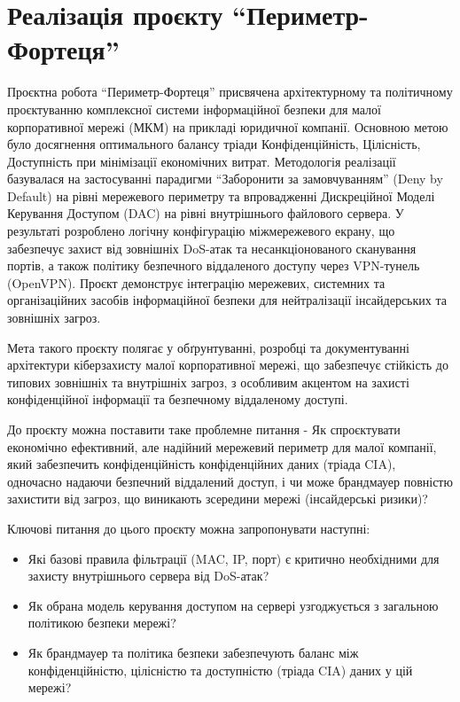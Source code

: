 


\section {\centering Реалізація проєкту ``Периметр-Фортеця''}

Проєктна робота ``Периметр-Фортеця''  присвячена архітектурному та політичному проєктуванню комплексної системи інформаційної безпеки для малої корпоративної мережі (МКМ) на прикладі юридичної компанії. Основною метою було досягнення оптимального балансу тріади Конфіденційність, Цілісність, Доступність при мінімізації економічних витрат. Методологія реалізації базувалася на застосуванні парадигми ``Заборонити за замовчуванням'' (Deny by Default) на рівні мережевого периметру та впровадженні Дискреційної Моделі Керування Доступом (DAC) на рівні внутрішнього файлового сервера. У результаті розроблено логічну конфігурацію міжмережевого екрану, що забезпечує захист від зовнішніх DoS-атак та несанкціонованого сканування портів, а також політику безпечного віддаленого доступу через VPN-тунель (OpenVPN). Проєкт демонструє інтеграцію мережевих, системних та організаційних засобів інформаційної безпеки для нейтралізації інсайдерських та зовнішніх загроз.

Мета такого проєкту полягає у обґрунтуванні, розробці та документуванні архітектури кіберзахисту малої корпоративної мережі, що забезпечує стійкість до типових зовнішніх та внутрішніх загроз, з особливим акцентом на захисті конфіденційної інформації та безпечному віддаленому доступі.

До проєкту можна поставити таке проблемне питання - Як спроєктувати економічно ефективний, але надійний мережевий периметр для малої компанії, який забезпечить конфіденційність конфіденційних даних (тріада CIA), одночасно надаючи безпечний віддалений доступ, і чи може брандмауер повністю захистити від загроз, що виникають зсередини мережі (інсайдерські ризики)?

Ключові питання до цього проєкту можна запропонувати наступні:
\begin{itemize}
    \item Які базові правила фільтрації (MAC, IP, порт) є критично необхідними для захисту внутрішнього сервера від DoS-атак?
    \item Як обрана модель керування доступом на сервері узгоджується з загальною політикою безпеки мережі?
    \item Як брандмауер та політика безпеки забезпечують баланс між конфіденційністю, цілісністю та доступністю (тріада CIA) даних у цій мережі?
\end{itemize}


